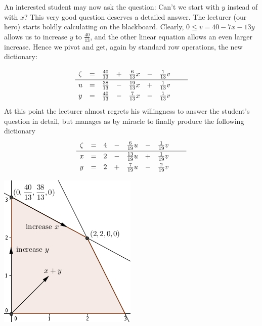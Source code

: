 \documentclass[ukenglish]{nik}
\begin{document}
An interested student may now ask the question: 
Can't we start with $y$ instead of with $x$?
This very good question deserves a detailed answer.
The lecturer (our hero) starts boldly calculating on the blackboard.
Clearly, $0\leq v = 40 - 7x -13y$ allows us to increase $y$ to $\frac{40}{13}$,
and the other linear equation allows an even larger increase. Hence we pivot and get,
again by standard row operations, the new dictionary:
\begin{minipage}{.5\textwidth}
\[    
    \begin{array}{lcrcrcrcr}
      \zeta&=& \frac{40}{13} &+& \frac{6}{13} x &-& \frac{1}{13} v &\vphantom{\frac{|}{|}} &  \\\hline
      u    &=& \frac{38}{13} &-&\frac{19}{13} x &+& \frac{1}{13} v &\vphantom{\frac{|}{|}} &  \\
      y    &=& \frac{40}{13} &-& \frac{7}{13} x &-& \frac{1}{13} v &\vphantom{\frac{|}{|}} &  \\
    \end{array}
\]
At this point the lecturer almost regrets his willingness to answer the student's
question in detail, but manages as by miracle to finally produce the following dictionary
\[    
    \begin{array}{lcrcrcrcr}
      \zeta&=& 4 &-& \frac{6}{19} u &-& \frac{1}{19} v &\vphantom{\frac{|}{|}} &  \\\hline
      x    &=& 2 &-&\frac{13}{19} u &+& \frac{1}{19} v &\vphantom{\frac{|}{|}} &  \\
      y    &=& 2 &+& \frac{7}{19} u &-& \frac{2}{19} v &\vphantom{\frac{|}{|}} &  \\
    \end{array}
\]
\end{minipage}
	\begin{minipage}{.45\textwidth}
				\includegraphics{ex4.jpg}
\end{minipage}
\vspace{.2cm}
\end{document}
